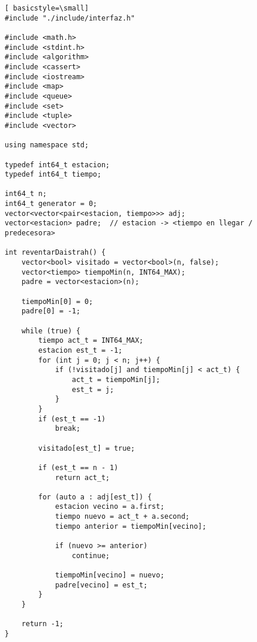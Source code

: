 \begin{lstlisting}[ basicstyle=\small]
#include "./include/interfaz.h"

#include <math.h>
#include <stdint.h>
#include <algorithm>
#include <cassert>
#include <iostream>
#include <map>
#include <queue>
#include <set>
#include <tuple>
#include <vector>

using namespace std;

typedef int64_t estacion;
typedef int64_t tiempo;

int64_t n;
int64_t generator = 0;
vector<vector<pair<estacion, tiempo>>> adj;
vector<estacion> padre;  // estacion -> <tiempo en llegar / predecesora>

int reventarDaistrah() {
    vector<bool> visitado = vector<bool>(n, false);
    vector<tiempo> tiempoMin(n, INT64_MAX);
    padre = vector<estacion>(n);

    tiempoMin[0] = 0;
    padre[0] = -1;

    while (true) {
        tiempo act_t = INT64_MAX;
        estacion est_t = -1;
        for (int j = 0; j < n; j++) {
            if (!visitado[j] and tiempoMin[j] < act_t) {
                act_t = tiempoMin[j];
                est_t = j;
            }
        }
        if (est_t == -1)
            break;

        visitado[est_t] = true;

        if (est_t == n - 1)
            return act_t;

        for (auto a : adj[est_t]) {
            estacion vecino = a.first;
            tiempo nuevo = act_t + a.second;
            tiempo anterior = tiempoMin[vecino];

            if (nuevo >= anterior)
                continue;

            tiempoMin[vecino] = nuevo;
            padre[vecino] = est_t;
        }
    }

    return -1;
}

\end{lstlisting}
